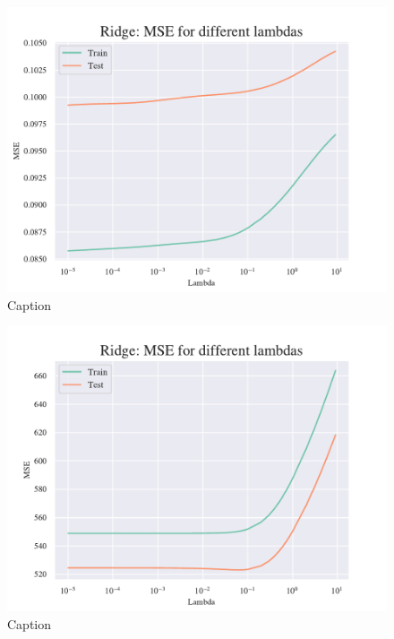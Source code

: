 \begin{figure}
    \centering
    \includegraphics[width=1\linewidth]{project_1/figures/figures_in_appendix/Ridge_MSE_Franke_Noise.pdf}
    \caption{Caption}
    \label{fig:ref}
\end{figure}

\begin{figure}
    \centering
    \includegraphics[width=1\linewidth]{project_1/figures/figures_in_appendix/Ridge_MSE_terrain.pdf}
    \caption{Caption}
    \label{fig:ref}
\end{figure}

